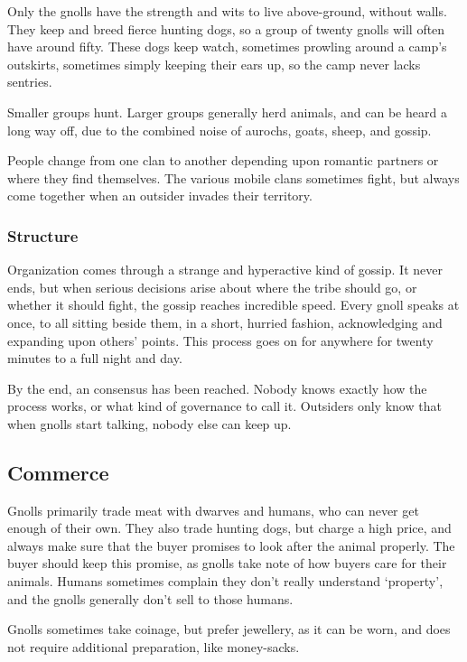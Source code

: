 \begin{multicols}{2}
\renewcommand\npcsymbol{\Nl}

\noindent
Only the gnolls have the strength and wits to live above-ground, without walls.
They keep and breed fierce hunting dogs, so a group of twenty gnolls will often have around fifty.
These dogs keep watch, sometimes prowling around a camp's outskirts, sometimes simply keeping their ears up, so the camp never lacks sentries.

Smaller groups hunt.
Larger groups generally herd animals, and can be heard a long way off, due to the combined noise of aurochs, goats, sheep, and gossip.

People change from one clan to another depending upon romantic partners or where they find themselves.
The various mobile clans sometimes fight, but always come together when an outsider invades their territory.

\subsubsection{Structure}
Organization comes through a strange and hyperactive kind of gossip.
It never ends, but when serious decisions arise about where the tribe should go, or whether it should fight, the gossip reaches incredible speed.
Every gnoll speaks at once, to all sitting beside them, in a short, hurried fashion, acknowledging and expanding upon others' points.
This process goes on for anywhere for twenty minutes to a full night and day.

By the end, an consensus has been reached.
Nobody knows exactly how the process works, or what kind of governance to call it.
Outsiders only know that when gnolls start talking, nobody else can keep up.

\subsection{Commerce}

Gnolls primarily trade meat with dwarves and humans, who can never get enough of their own.
They also trade hunting dogs, but charge a high price, and always make sure that the buyer promises to look after the animal properly.
The buyer should keep this promise, as gnolls take note of how buyers care for their animals.
Humans sometimes complain they don't really understand `property', and the gnolls generally don't sell to those humans.

Gnolls sometimes take coinage, but prefer jewellery, as it can be worn, and does not require additional preparation, like money-sacks.


\end{multicols}
